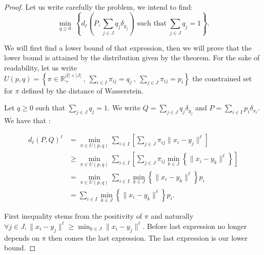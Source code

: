 \documentclass{amsart}
\newcommand{\RR}{\mathbb{R}}
\begin{document}
\begin{proof}
Let us write carefully the problem, we intend to find:
$$
    \min_{q\geq0}\:\left\{d_\ell\left(P,\sum_{j\in J}q_j\delta_{y_j}\right)\text{ such that} \;\sum_{j\in J}q_j=1 \right\}.
$$

We will first find a lower bound of that expression, then we will prove that the lower bound is attained by the distribution given by the theorem. For the sake of readability, let us write $U\left(p,q\right)=\left\{\pi\in\RR^{\lvert I\rvert\times\lvert J\rvert}_+\:,\: \sum_{i\in I}\pi_{ij}=q_j\:,\:\sum_{j\in J}\pi_{ij}=p_i\right\}$ the constrained set for $\pi$ defined by the distance of Wasserstein.
\newline
    
Let $q\geq 0$ such that $\sum_{j\in J}q_j=1$. We write $Q=\sum_{j\in J}q_j\delta_{y_j}$ and $P=\sum_{i\in I}p_i\delta_{x_i}$.  We have that :

\begin{align*}
    d_\ell\left(P,Q\right)^\ell&= \min_{\pi\in U\left(p,q\right)}\sum_{i\in I}\left[\sum_{j\in J}\pi_{ij}\lVert x_i-y_j\rVert^\ell\right] \\
    &\geq \min_{\pi\in U\left(p,q\right)}\sum_{i\in I}\left[\sum_{j\in J}\pi_{ij}\min_{k\in J}\left\{\lVert x_i-y_k\lVert^\ell\right\}\right] \\ &= \min_{\pi\in U\left(p,q\right)}\sum_{i\in I}\min_{k\in J}\left\{\lVert x_i-y_k\lVert^\ell\right\}p_i
    \\& =\sum_{i\in I}\min_{k\in J}\left\{\lVert x_i-y_k\lVert^\ell\right\}p_i.
\end{align*}
    
First inequality stems from the positivity of $\pi$ and naturally $\forall j\in J, \lVert x_i-y_j\rVert^\ell \geq \min_{k\in J}\lVert x_i-y_j\rVert^\ell$. Before last expression no longer depends on $\pi$ then comes the last expression. The last expression is our lower bound. 


\end{proof}
\end{document}
